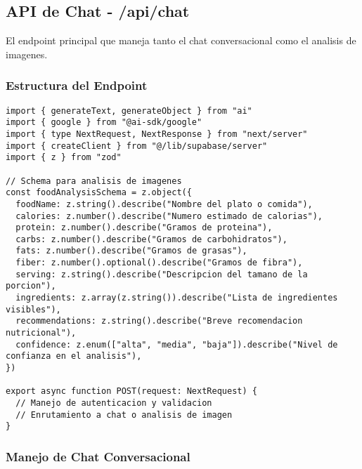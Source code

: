 \documentclass[12pt,a4paper]{article}
\begin{document}
\subsection{API de Chat - /api/chat}

El endpoint principal que maneja tanto el chat conversacional como el analisis de imagenes.

\subsubsection{Estructura del Endpoint}

\begin{lstlisting}[caption=Estructura basica del endpoint /api/chat]
import { generateText, generateObject } from "ai"
import { google } from "@ai-sdk/google"
import { type NextRequest, NextResponse } from "next/server"
import { createClient } from "@/lib/supabase/server"
import { z } from "zod"

// Schema para analisis de imagenes
const foodAnalysisSchema = z.object({
  foodName: z.string().describe("Nombre del plato o comida"),
  calories: z.number().describe("Numero estimado de calorias"),
  protein: z.number().describe("Gramos de proteina"),
  carbs: z.number().describe("Gramos de carbohidratos"),
  fats: z.number().describe("Gramos de grasas"),
  fiber: z.number().optional().describe("Gramos de fibra"),
  serving: z.string().describe("Descripcion del tamano de la porcion"),
  ingredients: z.array(z.string()).describe("Lista de ingredientes visibles"),
  recommendations: z.string().describe("Breve recomendacion nutricional"),
  confidence: z.enum(["alta", "media", "baja"]).describe("Nivel de confianza en el analisis"),
})

export async function POST(request: NextRequest) {
  // Manejo de autenticacion y validacion
  // Enrutamiento a chat o analisis de imagen
}
\end{lstlisting}

\subsubsection{Manejo de Chat Conversacional}
\end{document}
